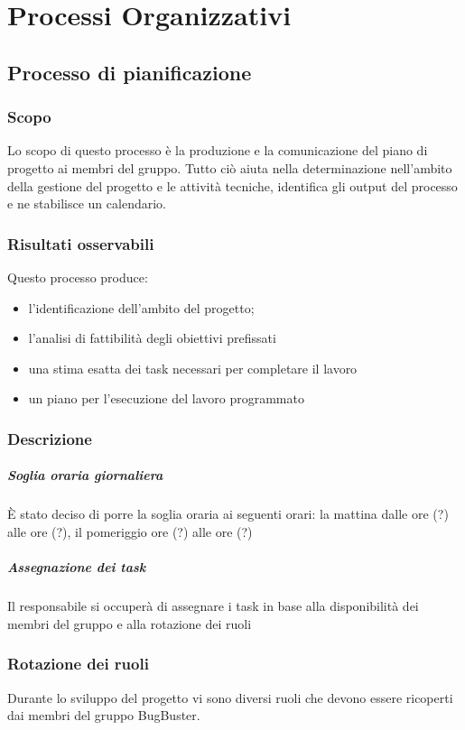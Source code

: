 \chapter{Processi Organizzativi}

\section{Processo di pianificazione}

\subsection{Scopo}

Lo scopo di questo processo è la produzione e la comunicazione del piano di progetto ai membri del gruppo. Tutto ciò aiuta nella determinazione nell'ambito della gestione del progetto e le attività tecniche, identifica gli output del processo e ne stabilisce un calendario.


\subsection{Risultati osservabili}

Questo processo produce:
\begin{itemize}

\item l'identificazione dell'ambito del progetto;
\item l'analisi di fattibilità degli obiettivi prefissati
\item una stima esatta dei task necessari per completare il lavoro
\item un piano per l'esecuzione del lavoro programmato

\end{itemize}

\subsection{Descrizione}

\paragraph*{Soglia oraria giornaliera}È stato deciso di porre la soglia oraria ai seguenti orari: la mattina dalle ore (?) alle ore (?), il pomeriggio  ore (?) alle ore (?) %

\paragraph*{Assegnazione dei task}Il responsabile si occuperà di assegnare i task in base alla disponibilità dei membri del gruppo e alla rotazione dei ruoli

\subsection{Rotazione dei ruoli}

Durante lo sviluppo del progetto vi sono diversi ruoli che devono essere ricoperti dai membri del gruppo BugBuster. 
